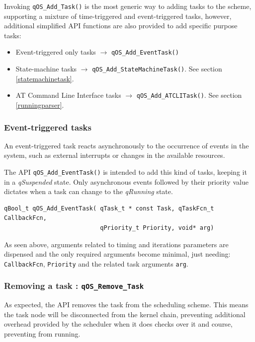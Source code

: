 \documentclass{article}
\begin{document}
\noindent\hrulefill

Invoking \lstinline{qOS_Add_Task()}  is the most generic way to adding tasks to the scheme, supporting a mixture of time-triggered and event-triggered tasks, however, additional simplified API functions are also provided to add specific purpose tasks:
\begin{itemize}
    \item Event-triggered only tasks $\rightarrow$ \lstinline{qOS_Add_EventTask()}
    \item State-machine tasks $\rightarrow$ \lstinline{qOS_Add_StateMachineTask()}. See section \ref{statemachinetask}.
    \item AT Command Line Interface tasks $\rightarrow$ \lstinline{qOS_Add_ATCLITask()}. See section \ref{runningparser}.
\end{itemize}


\subsubsection{Event-triggered tasks}
An event-triggered task reacts asynchronously to the occurrence of events in the system, such as external interrupts or changes in the available resources. 

The API \lstinline{qOS_Add_EventTask()}  is intended to add this kind of tasks, keeping it in a \textit{qSuspended} state. Only asynchronous events followed by their priority value dictates when a task can change to the \textit{qRunning} state. \\


\begin{lstlisting}[style=CStyle]
qBool_t qOS_Add_EventTask( qTask_t * const Task, qTaskFcn_t CallbackFcn, 
                           qPriority_t Priority, void* arg)
\end{lstlisting}

As seen above, arguments related to timing and iterations parameters are dispensed and the only required arguments become minimal, just needing:  \lstinline{CallbackFcn}, \lstinline{Priority} and the related task arguments \lstinline{arg}.

\subsubsection{Removing a task : \lstinline{qOS_Remove_Task}}
As expected, the API removes the task from the scheduling scheme.  This means the task node will be disconnected from the kernel chain, preventing additional overhead provided by the scheduler when it does checks over it and course, preventing from running. \\
\end{document}
